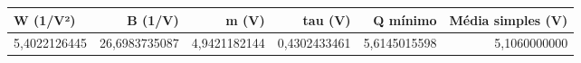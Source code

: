\begin{tabular}{lrrrrr}
\toprule
W (1/V²) & B (1/V) & m (V) & tau (V) & Q mínimo & Média simples (V) \\
\midrule
5,4022126445 & 26,6983735087 & 4,9421182144 & 0,4302433461 & 5,6145015598 & 5,1060000000 \\
\bottomrule
\end{tabular}
